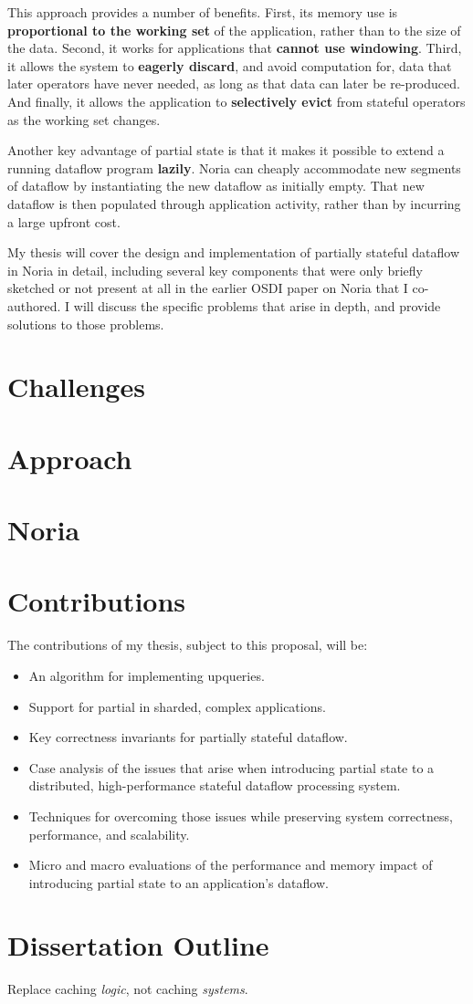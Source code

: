 This approach provides a number of benefits. First, its memory use is
\textbf{proportional to the working set} of the application, rather than to the
size of the data. Second, it works for applications that \textbf{cannot use
windowing}. Third, it allows the system to \textbf{eagerly discard}, and avoid
computation for, data that later operators have never needed, as long as that
data can later be re-produced. And finally, it allows the application to
\textbf{selectively evict} from stateful operators as the working set changes.

Another key advantage of partial state is that it makes it possible to extend a
running dataflow program \textbf{lazily}. Noria can cheaply accommodate new
segments of dataflow by instantiating the new dataflow as initially empty. That
new dataflow is then populated through application activity, rather than by
incurring a large upfront cost.

My thesis will cover the design and implementation of partially stateful
dataflow in Noria in detail, including several key components that were only
briefly sketched or not present at all in the earlier OSDI paper on
Noria\cite{noria} that I co-authored. I will discuss the specific problems that
arise in depth, and provide solutions to those problems.

\section{Challenges}
\section{Approach}
\section{Noria}
\section{Contributions}

The contributions of my thesis, subject to this proposal, will be:

\begin{itemize}
 \item An algorithm for implementing upqueries.
 \item Support for partial in sharded, complex applications.
 \item Key correctness invariants for partially stateful dataflow.
 \item Case analysis of the issues that arise when introducing partial state to
	 a distributed, high-performance stateful dataflow processing system.
 \item Techniques for overcoming those issues while preserving system
	 correctness, performance, and scalability.
 \item Micro and macro evaluations of the performance and memory impact of
	 introducing partial state to an application's dataflow.
\end{itemize}

\section{Dissertation Outline}

Replace caching \emph{logic}, not caching \emph{systems}.
